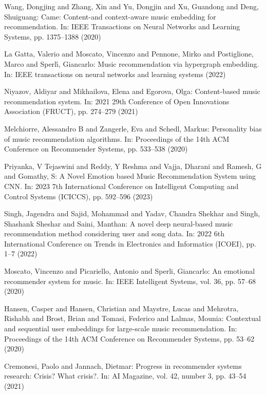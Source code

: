 \documentclass[runningheads,a4paper]{llncs}
\begin{document}
\newpage
\begin{thebibliography}{4}

 Wang, Dongjing and Zhang, Xin and Yu, Dongjin and Xu, Guandong and Deng, Shuiguang: 
Came: Content-and context-aware music embedding for recommendation. In: IEEE Transactions on Neural Networks and Learning Systems,
pp. 1375--1388 (2020)

 La Gatta, Valerio and Moscato, Vincenzo and Pennone, Mirko and Postiglione, Marco and Sperl{\'\i}, Giancarlo:
Music recommendation via hypergraph embedding. In: IEEE transactions on neural networks and learning systems (2022)

 Niyazov, Aldiyar and Mikhailova, Elena and Egorova, Olga:
Content-based music recommendation system. In: 2021 29th Conference of Open Innovations Association (FRUCT),
pp. 274--279 (2021)

 Melchiorre, Alessandro B and Zangerle, Eva and Schedl, Markus:
Personality bias of music recommendation algorithms. In: Proceedings of the 14th ACM Conference on Recommender Systems, 
pp. 533--538 (2020)

 Priyanka, V Tejaswini and Reddy, Y Reshma and Vajja, Dharani and Ramesh, G and Gomathy, S:
A Novel Emotion based Music Recommendation System using CNN. In: 2023 7th International Conference on Intelligent Computing and Control Systems (ICICCS),
pp. 592--596 (2023)

 Singh, Jagendra and Sajid, Mohammad and Yadav, Chandra Shekhar and Singh, Shashank Sheshar and Saini, Manthan:
A novel deep neural-based music recommendation method considering user and song data. In: 2022 6th International Conference on Trends in Electronics and Informatics (ICOEI),
pp. 1--7 (2022)

 Moscato, Vincenzo and Picariello, Antonio and Sperli, Giancarlo:
An emotional recommender system for music. In: IEEE Intelligent Systems, vol. 36, pp. 57--68 (2020)

 Hansen, Casper and Hansen, Christian and Maystre, Lucas and Mehrotra, Rishabh and Brost, Brian and Tomasi, Federico and Lalmas, Mounia:
Contextual and sequential user embeddings for large-scale music recommendation. In: 
Proceedings of the 14th ACM Conference on Recommender Systems, pp. 53--62 (2020)

 Cremonesi, Paolo and Jannach, Dietmar: Progress in recommender systems research: Crisis? What crisis?. In:
AI Magazine, vol. 42, number 3, pp. 43--54 (2021)


\end{thebibliography}
\end{document}
